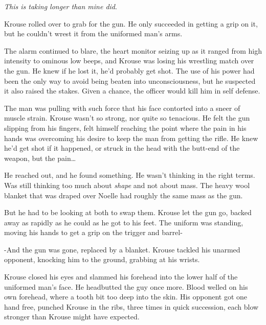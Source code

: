 \emph{This is taking longer than mine did}.



Krouse rolled over to grab for the gun.  He only succeeded in getting a grip on it, but he couldn't wrest it from the uniformed man's arms.



The alarm continued to blare, the heart monitor seizing up as it ranged from high intensity to ominous low beeps, and Krouse was losing his wrestling match over the gun.  He knew if he lost it, he'd probably get shot.  The use of his power had been the only way to avoid being beaten into unconsciousness, but he suspected it also raised the stakes.  Given a chance, the officer would kill him in self defense.



The man was pulling with such force that his face contorted into a sneer of muscle strain.  Krouse wasn't so strong, nor quite so tenacious.  He felt the gun slipping from his fingers, felt himself reaching the point where the pain in his hands was overcoming his desire to keep the man from getting the rifle.  He knew he'd get shot if it happened, or struck in the head with the butt-end of the weapon, but the pain\ldots



He reached out, and he found something.  He wasn't thinking in the right terms.  Was still thinking too much about \emph{shape} and not about mass.  The heavy wool blanket that was draped over Noelle had roughly the same mass as the gun.



But he had to be looking at both to swap them.  Krouse let the gun go, backed away as rapidly as he could as he got to his feet.  The uniform was standing, moving his hands to get a grip on the trigger and barrel-



-And the gun was gone, replaced by a blanket.  Krouse tackled his unarmed opponent, knocking him to the ground, grabbing at his wrists.



Krouse closed his eyes and slammed his forehead into the lower half of the uniformed man's face.  He headbutted the guy once more.  Blood welled on his own forehead, where a tooth bit too deep into the skin.  His opponent got one hand free, punched Krouse in the ribs, three times in quick succession, each blow stronger than Krouse might have expected.



